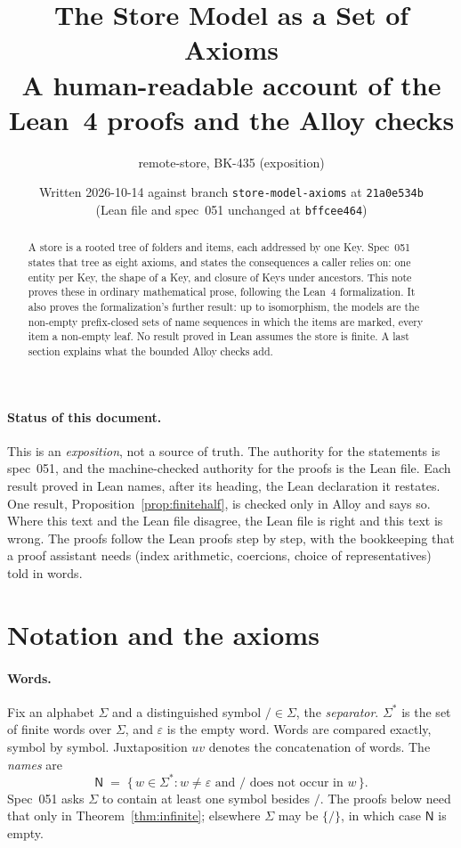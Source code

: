\documentclass[11pt,a4paper]{article}
\title{The Store Model as a Set of Axioms\\[0.3em]
\large A human-readable account of the Lean~4 proofs and the Alloy checks}
\author{remote-store, BK-435 (exposition)}
\date{Written 2026-10-14 against branch \texttt{store-model-axioms} at \texttt{21a0e534b}\\
(Lean file and spec~051 unchanged at \texttt{bffcee464})}
\newcommand{\sep}{\mathord{/}}              %
\newcommand{\eps}{\varepsilon}
\newcommand{\N}{\mathsf{N}}                 %
\theoremstyle{plain}
\theoremstyle{definition}
\theoremstyle{remark}
\begin{document}
\maketitle

\begin{abstract}
A store is a rooted tree of folders and items, each addressed by one Key.
Spec~051 states that tree as eight axioms, and states the consequences a
caller relies on: one entity per Key, the shape of a Key, and closure of Keys
under ancestors. This note proves these in ordinary mathematical prose,
following the Lean~4 formalization. It also proves the formalization's
further result: up to isomorphism, the models are the non-empty prefix-closed sets of
name sequences in which the items are marked, every item a non-empty leaf.
No result proved in Lean assumes the store is finite.
A last section explains what the bounded Alloy checks add.
\end{abstract}

\paragraph{Status of this document.}
This is an \emph{exposition}, not a source of truth. The authority for the
statements is spec~051, and the machine-checked authority for the proofs is
the Lean file. Each result proved in Lean names, after its heading, the Lean
declaration it restates. One result, Proposition~\ref{prop:finitehalf}, is
checked only in Alloy and says so. Where this text and the Lean file disagree, the Lean file is right
and this text is wrong. The proofs follow the Lean proofs step by step, with
the bookkeeping that a proof assistant needs (index arithmetic, coercions,
choice of representatives) told in words.

\tableofcontents

\section{Notation and the axioms}
\label{sec:axioms}

\paragraph{Words.}
Fix an alphabet $\Sigma$ and a distinguished symbol $\sep\in\Sigma$, the
\emph{separator}. $\Sigma^*$ is the set of finite words over $\Sigma$, and
$\eps$ is the empty word. Words are compared exactly, symbol by symbol.
Juxtaposition $uv$ denotes the concatenation of words.
The \emph{names} are
\[
  \N \;=\; \{\, w\in\Sigma^* : w\neq\eps \text{ and } \sep \text{ does not occur in } w \,\}.
\]
Spec~051 asks $\Sigma$ to contain at least one symbol besides $\sep$. The proofs
below need that only in Theorem~\ref{thm:infinite}; elsewhere $\Sigma$ may be
$\{\sep\}$, in which case $\N$ is empty.
\end{document}
